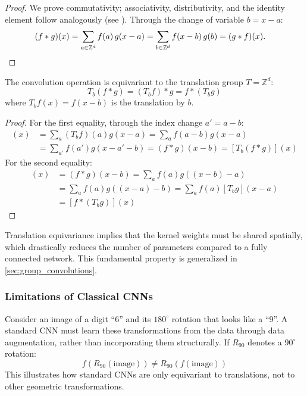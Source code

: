 \begin{proof}
We prove commutativity; associativity, distributivity, and the identity element follow analogously (see \citep[Ch.~1]{Folland1999}). Through the change of variable \(b = x - a\):
\begin{align}
(f * g)(x) &= \sum_{a \in \mathbb{Z}^d} f(a)\,g(x - a) = \sum_{b \in \mathbb{Z}^d} f(x - b)\,g(b) = (g * f)(x). \qedhere
\end{align}
\end{proof}

\begin{theorem}\label{theorem:convolution_translation_equivariance}
The convolution operation is equivariant to the translation group \(T = \mathbb{Z}^d\):
\[
T_b(f * g) = (T_b f) * g = f * (T_b g)
\]
where \(T_b f(x) = f(x - b)\) is the translation by \(b\).
\end{theorem}

\begin{proof}
For the first equality, through the index change $a' = a - b$:
\begin{align}
[(T_b f) * g](x) &= \sum_a (T_b f)(a) g(x - a) = \sum_a f(a - b) g(x - a) \\
                  &= \sum_{a'} f(a') g(x - a' - b) = (f * g)(x - b) = [T_b(f * g)](x)
\end{align}
For the second equality:
\begin{align}
[T_b(f * g)](x) &= (f * g)(x - b) = \sum_a f(a)g((x-b) - a) \\
                 &= \sum_a f(a)g((x - a) - b) = \sum_a f(a)[T_b g](x - a) \\
                 &= [f * (T_b g)](x)
\end{align}
\end{proof}

Translation equivariance implies that the kernel weights must be shared spatially, which drastically reduces the number of parameters compared to a fully connected network. This fundamental property is generalized in \autoref{sec:group_convolutions}.

\subsubsection{Limitations of Classical CNNs}

\begin{example}
Consider an image of a digit ``6'' and its $180^{\circ}$ rotation that looks like a ``9''. A standard \gls{CNN} must learn these transformations from the data through data augmentation, rather than incorporating them structurally. If $R_{90}$ denotes a $90^{\circ}$ rotation:
\[
f(R_{90}(\text{image})) \neq R_{90}(f(\text{image}))
\]
This illustrates how standard \glspl{CNN} are only equivariant to translations, not to other geometric transformations.
\end{example}

